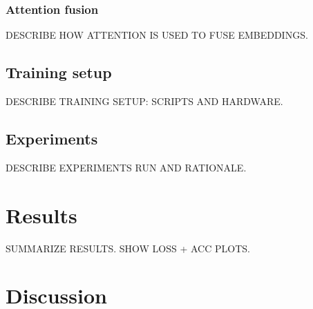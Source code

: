 \documentclass[letterpaper]{article} %
\begin{document}
\subsubsection{Attention fusion}

DESCRIBE HOW ATTENTION IS USED TO FUSE EMBEDDINGS.

\subsection{Training setup}

DESCRIBE TRAINING SETUP: SCRIPTS AND HARDWARE.

\subsection{Experiments}

DESCRIBE EXPERIMENTS RUN AND RATIONALE.

\section{Results}

SUMMARIZE RESULTS. SHOW LOSS + ACC PLOTS.

\section{Discussion}

\appendix


\end{document}
